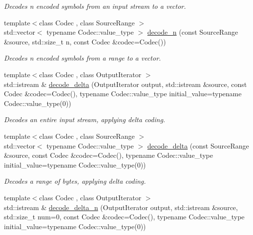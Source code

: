 \begin{DoxyCompactItemize}
\begin{DoxyCompactList}\small\item\em Decodes {\ttfamily n} encoded symbols from an input stream to a vector. \end{DoxyCompactList}\item 
{\footnotesize template$<$class Codec , class Source\+Range $>$ }\\std\+::vector$<$ typename Codec\+::value\+\_\+type $>$ \mbox{\hyperlink{namespaceirk_a6fb4092edc448640f1d37c4822ced00a}{decode\+\_\+n}} (const Source\+Range \&source, std\+::size\+\_\+t n, const Codec \&codec=Codec())
\begin{DoxyCompactList}\small\item\em Decodes {\ttfamily n} encoded symbols from a range to a vector. \end{DoxyCompactList}\item 
{\footnotesize template$<$class Codec , class Output\+Iterator $>$ }\\std\+::istream \& \mbox{\hyperlink{namespaceirk_ab01706e2b10ac8d4cd7bfe5d37f307f7}{decode\+\_\+delta}} (Output\+Iterator output, std\+::istream \&source, const Codec \&codec=Codec(), typename Codec\+::value\+\_\+type initial\+\_\+value=typename Codec\+::value\+\_\+type(0))
\begin{DoxyCompactList}\small\item\em Decodes an entire input stream, applying delta coding. \end{DoxyCompactList}\item 
{\footnotesize template$<$class Codec , class Source\+Range $>$ }\\std\+::vector$<$ typename Codec\+::value\+\_\+type $>$ \mbox{\hyperlink{namespaceirk_ac3c3f0b74d845f8d3313689ff709e191}{decode\+\_\+delta}} (const Source\+Range \&source, const Codec \&codec=Codec(), typename Codec\+::value\+\_\+type initial\+\_\+value=typename Codec\+::value\+\_\+type(0))
\begin{DoxyCompactList}\small\item\em Decodes a range of bytes, applying delta coding. \end{DoxyCompactList}\item 
{\footnotesize template$<$class Codec , class Output\+Iterator $>$ }\\std\+::istream \& \mbox{\hyperlink{namespaceirk_a9dbe259f7a22df7f96241e95331c9305}{decode\+\_\+delta\+\_\+n}} (Output\+Iterator output, std\+::istream \&source, std\+::size\+\_\+t num=0, const Codec \&codec=Codec(), typename Codec\+::value\+\_\+type initial\+\_\+value=typename Codec\+::value\+\_\+type(0))

\end{DoxyCompactItemize}

